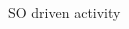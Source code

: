\documentclass[aspectratio=43]{beamer}
\begin{document}
\begin{frame}{SO driven activity}
{\begin{columns}
\begin{column}{0.5\textwidth}
		\end{column}
	\end{columns}
}	

\end{frame}



\end{document}
